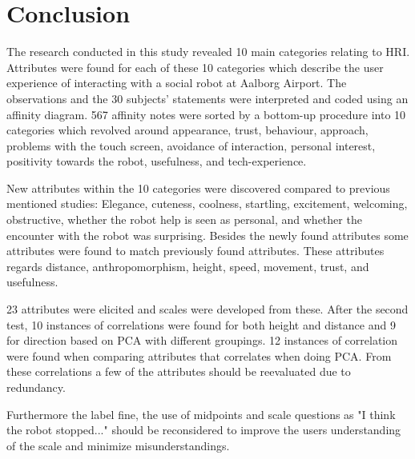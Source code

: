 \section{Conclusion}
\label{Conclusion}
%
The research conducted in this study revealed 10 main categories relating to HRI. Attributes were found for each of these 10 categories which describe the user experience of interacting with a social robot at Aalborg Airport. The observations and the 30 subjects' statements were interpreted and coded using an affinity diagram. 567 affinity notes were sorted by a bottom-up procedure into 10 categories which revolved around appearance, trust, behaviour, approach, problems with the touch screen, avoidance of interaction, personal interest, positivity towards the robot, usefulness, and tech-experience.

New attributes within the 10 categories were discovered compared to previous mentioned studies: Elegance, cuteness, coolness, startling, excitement, welcoming, obstructive, whether the robot help is seen as personal, and whether the encounter with the robot was surprising. Besides the newly found attributes some attributes were found to match previously found attributes. These attributes regards distance, anthropomorphism, height, speed, movement, trust, and usefulness.

23 attributes were elicited and scales were developed from these. After the second test, 10 instances of correlations were found for both height and distance and 9 for direction based on PCA with different groupings. 12 instances of correlation were found when comparing attributes that correlates when doing PCA. From these correlations a few of the attributes should be reevaluated due to redundancy.

Furthermore the label fine, the use of midpoints and scale questions as "I think the robot stopped..." should be reconsidered to improve the users understanding of the scale and minimize misunderstandings. 


